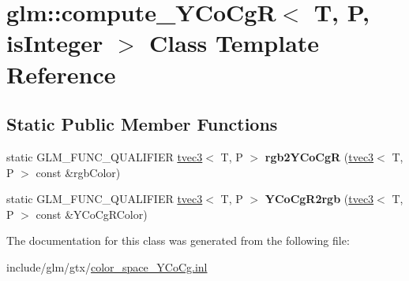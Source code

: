 \hypertarget{classglm_1_1compute__YCoCgR}{}\section{glm\+:\+:compute\+\_\+\+Y\+Co\+CgR$<$ T, P, is\+Integer $>$ Class Template Reference}
\label{classglm_1_1compute__YCoCgR}
\subsection*{Static Public Member Functions}
\begin{DoxyCompactItemize}
\item 
\mbox{\label{classglm_1_1compute__YCoCgR_af5f438f3ec49d12f350e6ed2bb1c896c}} 
static G\+L\+M\+\_\+\+F\+U\+N\+C\+\_\+\+Q\+U\+A\+L\+I\+F\+I\+ER \hyperlink{structglm_1_1tvec3}{tvec3}$<$ T, P $>$ {\bfseries rgb2\+Y\+Co\+CgR} (\hyperlink{structglm_1_1tvec3}{tvec3}$<$ T, P $>$ const \&rgb\+Color)
\item 
\mbox{\label{classglm_1_1compute__YCoCgR_a08e033fb9983afcffecc1b20de968715}} 
static G\+L\+M\+\_\+\+F\+U\+N\+C\+\_\+\+Q\+U\+A\+L\+I\+F\+I\+ER \hyperlink{structglm_1_1tvec3}{tvec3}$<$ T, P $>$ {\bfseries Y\+Co\+Cg\+R2rgb} (\hyperlink{structglm_1_1tvec3}{tvec3}$<$ T, P $>$ const \&Y\+Co\+Cg\+R\+Color)
\end{DoxyCompactItemize}


The documentation for this class was generated from the following file\+:\begin{DoxyCompactItemize}
\item 
include/glm/gtx/\hyperlink{color__space__YCoCg_8inl}{color\+\_\+space\+\_\+\+Y\+Co\+Cg.\+inl}\end{DoxyCompactItemize}
